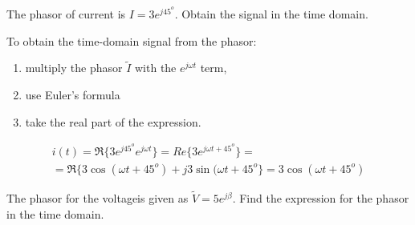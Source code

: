\documentclass{ximera}
\begin{document}
\begin{example}
The phasor of current is  $I=3 e^{j 45^o}$. Obtain the signal in the time domain.


\begin{explanation}
  To obtain the time-domain signal from the phasor:
\begin{enumerate}
\item multiply the phasor $\tilde{I}$ with the $ e^{j\omega t}$ term, 
\item use Euler's formula 
\item take the real part of the expression.
\end{enumerate}  
   


\begin{eqnarray}
i(t) = \Re\{ 3 e^{ j 45^o}  e^{j\omega t} \} =  Re\{3  e^{j \omega t + 45^o}  \} = \nonumber \\ = \Re \{ 3 \cos (\omega t + 45^o ) + j 3 \sin (\omega t + 45^o \} = 3  \cos (\omega t + 45^o ) \label{phtotd}
\end{eqnarray}


\end{explanation}


\end{example}


\begin{question}
The phasor for the  voltageis given as $\tilde{V}= 5 e^{ j \beta} $. Find the expression for the phasor in the time domain.
\begin{multipleChoice}  
\end{multipleChoice} 
\end{question}
\end{document}
